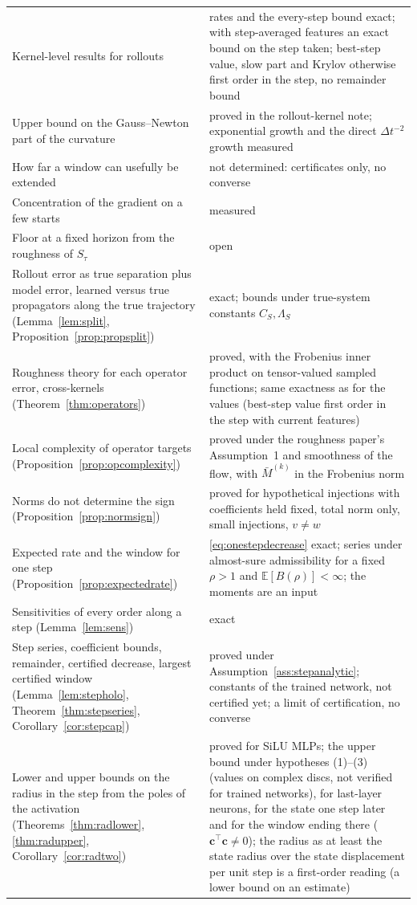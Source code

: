 \documentclass[11pt]{article}
\theoremstyle{definition}
\theoremstyle{remark}
\newcommand{\dt}{\Delta t}
\begin{document}
\begin{center}
\begin{tabular}{p{}p{}}
Kernel-level results for rollouts & rates and the every-step bound exact; with step-averaged features an exact bound on the step taken; best-step value, slow part and Krylov otherwise first order in the step, no remainder bound \\
Upper bound on the Gauss--Newton part of the curvature & proved in the rollout-kernel note; exponential growth and the direct $\dt^{-2}$ growth measured \\
How far a window can usefully be extended & not determined: certificates only, no converse \\
Concentration of the gradient on a few starts & measured \\
Floor at a fixed horizon from the roughness of $S_\tau$ & open \\
Rollout error as true separation plus model error, learned versus true propagators along the true trajectory (Lemma~\ref{lem:split}, Proposition~\ref{prop:propsplit}) & exact; bounds under true-system constants $C_S,\Lambda_S$ \\
Roughness theory for each operator error, cross-kernels (Theorem~\ref{thm:operators}) & proved, with the Frobenius inner product on tensor-valued sampled functions; same exactness as for the values (best-step value first order in the step with current features) \\
Local complexity of operator targets (Proposition~\ref{prop:opcomplexity}) & proved under the roughness paper's Assumption~1 and smoothness of the flow, with $\bar M^{(k)}$ in the Frobenius norm \\
Norms do not determine the sign (Proposition~\ref{prop:normsign}) & proved for hypothetical injections with coefficients held fixed, total norm only, small injections, $v\ne w$ \\
Expected rate and the window for one step (Proposition~\ref{prop:expectedrate}) & \eqref{eq:onestepdecrease} exact; series under almost-sure admissibility for a fixed $\rho>1$ and $\mathbb E[B(\rho)]<\infty$; the moments are an input \\
Sensitivities of every order along a step (Lemma~\ref{lem:sens}) & exact \\
Step series, coefficient bounds, remainder, certified decrease, largest certified window (Lemma~\ref{lem:stepholo}, Theorem~\ref{thm:stepseries}, Corollary~\ref{cor:stepcap}) & proved under Assumption~\ref{ass:stepanalytic}; constants of the trained network, not certified yet; a limit of certification, no converse \\
Lower and upper bounds on the radius in the step from the poles of the activation (Theorems~\ref{thm:radlower}, \ref{thm:radupper}, Corollary~\ref{cor:radtwo}) & proved for SiLU MLPs; the upper bound under hypotheses (1)--(3) (values on complex discs, not verified for trained networks), for last-layer neurons, for the state one step later and for the window ending there ($\mathbf c^\top\mathbf c\ne0$); the radius as at least the state radius over the state displacement per unit step is a first-order reading (a lower bound on an estimate) \\

\end{tabular}
\end{center}
\end{document}
